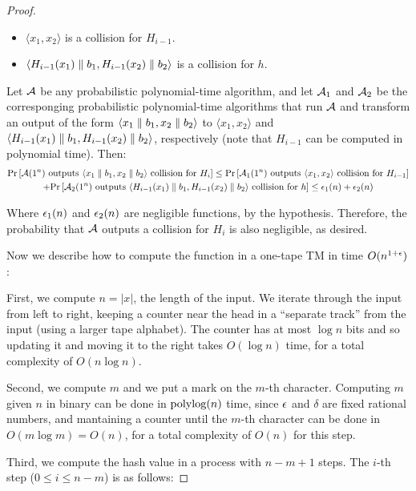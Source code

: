 \begin{proof}
\begin{itemize}
    \item $\langle x_1, x_2 \rangle$ is a collision for $H_{i-1}$.
    \item $\langle H_{i-1}(x_1) \parallel b_1, H_{i-1}(x_2) \parallel b_2 \rangle$ is a collision for $h$.
\end{itemize}

Let $\mathcal{A}$ be any probabilistic polynomial-time algorithm, and let $\mathcal{A}_1$ and $\mathcal{A}_2$ be the corresponging probabilistic
polynomial-time algorithms that run $\mathcal{A}$ and transform an output of the form $\langle x_1 \parallel b_1 , x_2 \parallel b_2 \rangle$ 
to $\langle x_1, x_2 \rangle$ and $\langle H_{i-1}(x_1) \parallel b_1, H_{i-1}(x_2) \parallel b_2 \rangle$, respectively 
(note that $H_{i-1}$ can be computed in polynomial time). Then:
\begin{multline*}
\text{Pr}\left[\mathcal{A}(1^n)  \text{ outputs } \langle x_1 \parallel b_1, x_2 \parallel b_2 \rangle \text{ collision for } H_i\right]
\leq \text{Pr}\left[\mathcal{A}_1(1^n) \text{ outputs } \langle x_1, x_2 \rangle \text{ collision for } H_{i-1}\right] \\
+ \text{Pr}\left[\mathcal{A}_2(1^n)  \text{ outputs }  \langle H_{i-1}(x_1) \parallel b_1, H_{i-1}(x_2) \parallel b_2 \rangle \text{ collision for } h\right] 
\leq \epsilon_1(n) + \epsilon_2(n) 
\end{multline*} 

Where $\epsilon_1(n)$ and $\epsilon_2(n)$ are negligible functions, by the hypothesis. Therefore, the probability that $\mathcal{A}$ outputs a 
collision for $H_i$ is also negligible, as desired. 

Now we describe how to compute the function in a one-tape TM in time $O(n^{1+\epsilon})$:

First, we compute $n = |x|$, the length of the input. We iterate through the input from left to right,
keeping a counter near the head in a ``separate track'' from the input 
(using a larger tape alphabet).  
The counter has at most $\log n$ bits and so updating it and moving it to the right takes
$O(\log n)$ time, for a total complexity of $O(n \log n)$. 

Second, we compute $m$ and we put a mark on the $m$-th character.
Computing $m$ given $n$ in binary can be done in $\text{polylog}(n)$ time, since
$\epsilon$ and $\delta$ are fixed rational numbers, and mantaining a counter until the $m$-th character can
be done in $O(m \log m) = O(n)$, for a total complexity of $O(n)$ for this step. 

Third, we compute the hash value in a process with $n-m+1$ steps. The $i$-th step ($0 \leq i \leq n-m$) is 
as follows:


\end{proof}

